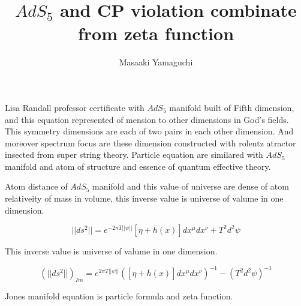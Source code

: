 \documentclass{jsarticle}
\begin{document}
\title{$AdS_5 $ and CP violation combinate from zeta function}
\author{Masaaki Yamaguchi}
\date{}
\maketitle


    Lisa Randall professor certificate with $AdS_5 $ manifold built of
  Fifth dimension, and this equation represented of 
  mension to other dimensions in God's fields.
  This symmetry dimensions are each of two pairs in each other dimension.
  And moreover spectrum focus are these dimension constructed with
  rolentz atractor insected from super string theory.
   Particle equation are similared with $AdS_5 $ manifold and atom of structure
   and essence of quantum effective theory.

    Atom distance of $AdS_5 $ manifold and this value of universe are dense of 
  atom relativeity of mass in volume, this inverse value is universe of valume
  in one dimension.

  $$ ||ds^2|| = e^{-2\pi T||\psi||}[\eta + \bar{h}(x)]dx^{\mu}dx^{\nu}
  + T^2 d^2 \psi $$

     This inverse value is universe of valume in one dimension.

  $$ (||ds^2||)_{Im} = e^{2\pi T||\psi||}\left([\eta + \bar{h}(x)]
  dx^{\mu}dx^{\nu}\right)^{-1} - \left(T^{2} d^2 \psi\right)^{-1}$$

     Jones manifold equation is particle formula and zeta function.
\end{document}
